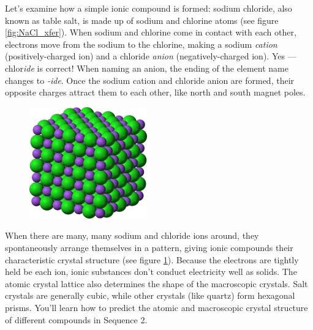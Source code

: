 Let's examine how a simple ionic compound is formed: sodium chloride, also known 
as table salt, is made up of sodium and chlorine atoms (see figure 
\ref{fig:NaCl_xfer}). When sodium and chlorine come in contact with each other, 
electrons move from the sodium to the chlorine, making a sodium \textit{cation} 
(positively-charged ion) and a chloride \textit{anion} (negatively-charged ion). 
Yes --- chlor\textit{ide} is correct! When naming an anion, the ending of the 
element name changes to \textit{-ide}. Once the sodium cation and chloride anion 
are formed, their opposite charges attract them to each other, like north and 
south magnet poles. 

\begin{figure}
\noindent\includegraphics[width=2in]{NaCl_lattice.png}
\caption{}
\label{fig:NaCl_lattice}
\end{figure}

When there are many, many sodium and chloride ions around, they spontaneously 
arrange themselves in a pattern, giving ionic compounds their characteristic 
crystal structure (see figure \ref{fig:NaCl_lattice}). Because the electrons are 
tightly held be each ion, ionic substances don't conduct electricity well as 
solids. The atomic crystal lattice also determines the shape of the macroscopic 
crystals. Salt crystals are generally cubic, while other crystals (like quartz) 
form hexagonal prisms. You'll learn how to predict the atomic and macroscopic 
crystal structure of different compounds in Sequence 2. 

